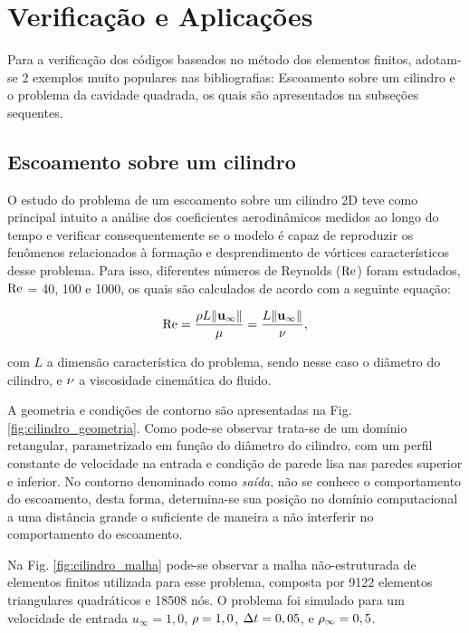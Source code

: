 \documentclass[tese_patricia]{subfiles}%
\begin{document}
\section{Verificação e Aplicações} \label{capitulo:Cap2:VerApl}

Para a verificação dos códigos baseados no método dos elementos finitos, adotam-se 2 exemplos muito populares nas bibliografias: Escoamento sobre um cilindro e o problema da cavidade quadrada, os quais são apresentados na subseções sequentes.

\subsection{Escoamento sobre um cilindro} \label{capitulo:Cap2:VerApl:Cilindo}

O estudo do problema de um escoamento sobre um cilindro 2D teve como principal intuito a análise dos coeficientes aerodinâmicos medidos ao longo do tempo e verificar consequentemente se o modelo é capaz de reproduzir os fenômenos relacionados à formação e desprendimento de vórtices característicos desse problema. Para isso, diferentes números de Reynolds ($\mathrm{Re}$) foram estudados, $\mathrm{Re}$ = 40, 100 e 1000, os quais são calculados de acordo com a seguinte equação:

\begin{align}
	\mathrm{Re} = \frac{\rho L \lVert\mathbf{u}_{\infty}\lVert}{\mu} = \frac{L \lVert \mathbf{u}_{\infty} \lVert}{\nu}, \label{eq:Reynolds}
\end{align}

\noindent com $L$ a dimensão característica do problema, sendo nesse caso o diâmetro do cilindro, e $\nu$ a viscosidade cinemática do fluido. 

A geometria e condições de contorno são apresentadas na Fig. \ref{fig:cilindro_geometria}. Como pode-se observar trata-se de um domínio retangular, parametrizado em função do diâmetro do cilindro, com um perfil constante de velocidade na entrada e condição de parede lisa nas paredes superior e inferior. No contorno denominado como \textit{saída}, não se conhece o comportamento do escoamento, desta forma, determina-se sua posição no domínio computacional a uma distância grande o suficiente de maneira a não interferir no comportamento do escoamento. 

Na Fig. \ref{fig:cilindro_malha} pode-se observar a malha não-estruturada de elementos finitos utilizada para esse problema, composta por 9122 elementos triangulares quadráticos e 18508 nós. O problema foi simulado para um velocidade de entrada $u_{\infty} = 1,0$, $\rho = 1,0$, $\Delta t = 0,05$, e $\rho_\infty = 0,5$. 
\end{document}
